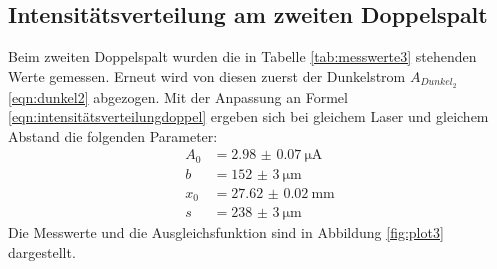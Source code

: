 \documentclass[
  bibliography=totoc,     %
  captions=tableheading,  %
  titlepage=firstiscover, %
]{scrartcl}
\begin{document}
\subsection{Intensitätsverteilung am zweiten Doppelspalt}
Beim zweiten Doppelspalt wurden die in Tabelle \ref{tab:messwerte3} stehenden
Werte gemessen. Erneut wird von diesen zuerst der Dunkelstrom $A_{Dunkel_2}$
\eqref{eqn:dunkel2} abgezogen. Mit der Anpassung an Formel
\eqref{eqn:intensitätsverteilungdoppel} ergeben sich
bei gleichem Laser und gleichem Abstand die folgenden Parameter:
\begin{align}
  A_0 &= \SI{2.98(7)}{\micro\ampere}\\
  b &= \SI{152(3)}{\micro\meter}\\
  x_0 &= \SI{27.62(2)}{\milli\meter}\\
  s &= \SI{238(3)}{\micro\meter}
\end{align}
Die Messwerte und die Ausgleichsfunktion sind in Abbildung \ref{fig:plot3}
dargestellt.
\end{document}
